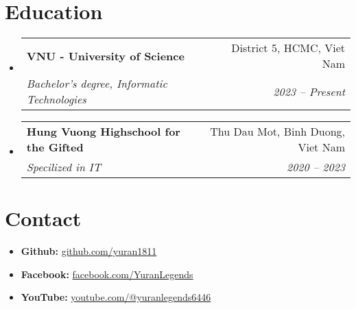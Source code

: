 \documentclass[letterpaper,11pt]{article}
\makeatletter
\newcommand{\resumeSubheading}[4]{
  \vspace{-1pt}\item
    \begin{tabular*}{0.97\textwidth}[t]{l@{\extracolsep{\fill}}r}
      \textbf{#1} & #2 \\
      \textit{\small#3} & \textit{\small #4} \\
    \end{tabular*}\vspace{-5pt}
}
\newcommand{\resumeSubHeadingListStart}{\begin{itemize}[leftmargin=*]}
\newcommand{\resumeSubHeadingListEnd}{\end{itemize}}
\makeatother
\begin{document}
\section{Education}
\resumeSubHeadingListStart
\resumeSubheading
{VNU - University of Science}{District 5, HCMC, Viet Nam}
{Bachelor's degree, Informatic Technologies}{2023 -- Present}
\resumeSubheading
{Hung Vuong Highschool for the Gifted}{Thu Dau Mot, Binh Duong, Viet Nam}
{Specilized in IT}{2020 -- 2023}
\resumeSubHeadingListEnd

\section{Contact}
\begin{itemize}[leftmargin=*]
	\small
	\item \textbf{Github:} \href{https://github.com/yuran1811}{github.com/yuran1811}\vspace{-5pt}
	\item \textbf{Facebook:} \href{https://www.facebook.com/YuranLegends}{facebook.com/YuranLegends}\vspace{-5pt}
	\item \textbf{YouTube:} \href{https://www.youtube.com/channel/UCLXNBb-jZRS_3o_itGGrGRA?view_as=subscriber}{youtube.com/@yuranlegends6446
	      }\vspace{-5pt}
\end{itemize}
\end{document}
